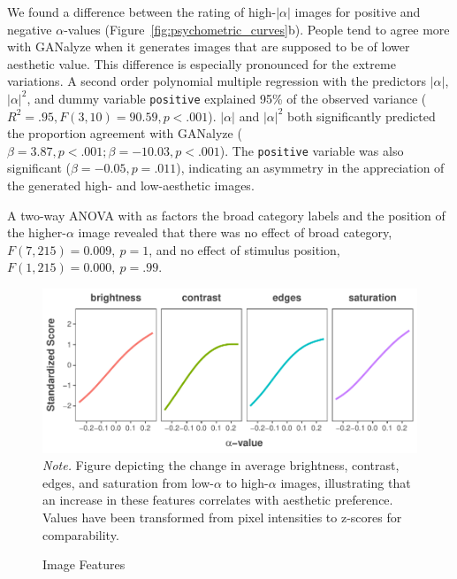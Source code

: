 \documentclass[../main.tex]{subfiles}
\begin{document}
We found a difference between the rating of high-$|\alpha|$ images for positive and negative $\alpha$-values (Figure~\ref{fig:psychometric_curves}b). People tend to agree more with GANalyze when it generates images that are supposed to be of lower aesthetic value. This difference is especially pronounced for the extreme variations. A second order polynomial multiple regression with the predictors $|\alpha|$, $|\alpha|^2$, and dummy variable \texttt{positive} explained 95\% of the observed variance ($R^2=.95, F(3,10)=90.59, p<.001$). $|\alpha|$ and $|\alpha|^2$ both significantly predicted the proportion agreement with GANalyze ($\beta=3.87, p<.001; \beta=-10.03, p<.001$). The \texttt{positive} variable was also significant ($\beta=-0.05, p=.011$), indicating an asymmetry in the appreciation of the generated high- and low-aesthetic images.

A two-way ANOVA with as factors the broad category labels and the position of the higher-$\alpha$ image revealed that there was no effect of broad category, $F(7,215)=0.009, \ p=1$, and no effect of stimulus position, $F(1,215)=0.000, \ p=.99$.

\begin{figure}[!t]
	\caption{Image Features}
	\label{fig:img_features}
	\includegraphics[width=1\linewidth]{images/results/img_features.pdf}
	{\textit{Note.} Figure depicting the change in average brightness, contrast, edges, and saturation from low-$\alpha$ to high-$\alpha$ images, illustrating that an increase in these features correlates with aesthetic preference. Values have been transformed from pixel intensities to z-scores for comparability.}
\end{figure}
\end{document}
